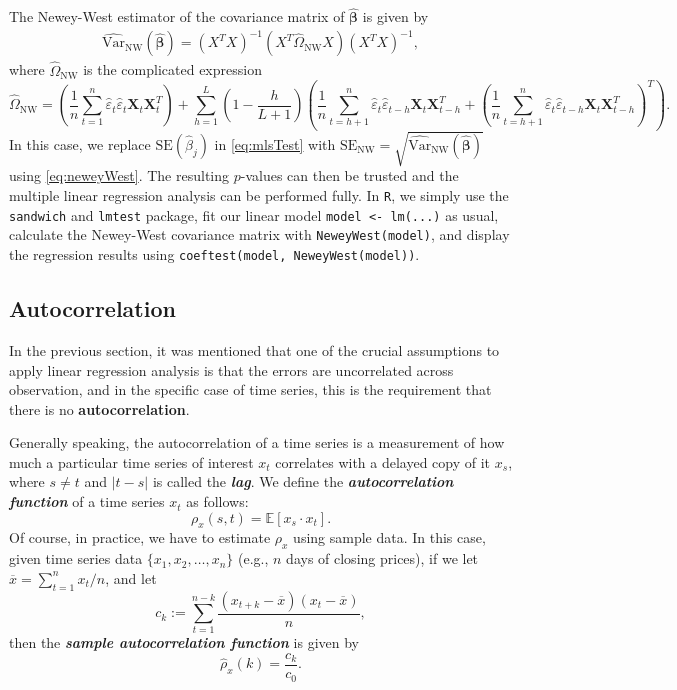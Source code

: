 \documentclass[12pt]{article}
\begin{document}
	
	The Newey-West estimator of the covariance matrix of $\widehat{\boldsymbol \beta}$ is given by
		\begin{eqnarray}
			\label{eq:neweyWest}
			\widehat{\mathrm{Var}}_{\mathrm{NW}}(\widehat{\boldsymbol \beta}) = (X^T X)^{-1} \left(X^T \widehat{\Omega}_{\mathrm{NW}}X\right)(X^T X)^{-1},
		\end{eqnarray}
		where $\widehat{\Omega}_{\mathrm{NW}}$ is the complicated expression $$\widehat{\Omega}_{\mathrm{NW}} = \left(\frac{1}{n}\sum_{t = 1}^n \widehat{\varepsilon}_t \widehat{\varepsilon}_{t} \mathbf{X}_t \mathbf{X}_{t}^T\right) + \sum_{h = 1}^L \left(1 - \frac{h}{L+ 1}\right)\left(\frac{1}{n}\sum_{t = h + 1}^n \widehat{\varepsilon}_t \widehat{\varepsilon}_{t - h} \mathbf{X}_t \mathbf{X}_{t - h}^T + \left(\frac{1}{n}\sum_{t = h + 1}^n \widehat{\varepsilon}_t \widehat{\varepsilon}_{t - h} \mathbf{X}_t \mathbf{X}_{t - h}^T\right)^T\right).$$
		In this case, we replace $\mathrm{SE}(\widehat{\beta}_j)$ in \autoref{eq:mlsTest} with $\mathrm{SE}_{\mathrm{NW}} = \sqrt{	\widehat{\mathrm{Var}}_{\mathrm{NW}}(\widehat{\boldsymbol \beta})}$ using \autoref{eq:neweyWest}. The resulting $p$-values can then be trusted and the multiple linear regression analysis can be performed fully. In \texttt{R}, we simply use the \texttt{sandwich} and \texttt{lmtest} package, fit our linear model \texttt{model <- lm(...)} as usual, calculate the Newey-West covariance matrix with \texttt{NeweyWest(model)}, and display the regression results using \texttt{coeftest(model, NeweyWest(model))}. 
		\newpage 
		\subsection{Autocorrelation}
		\label{subsec:2.4}
		In the previous section, it was mentioned that one of the crucial assumptions to apply linear regression analysis is that the errors are uncorrelated across observation, and in the specific case of time series, this is the requirement that there is no \textbf{autocorrelation}. 
		
		
		Generally speaking, the autocorrelation of a time series is a measurement of how much a particular time series of interest $x_t$ correlates with a delayed copy of it $x_{s}$, where $s \neq t$ and $|t - s|$ is called the \textbf{\textit{lag}}. We define the \textbf{\textit{autocorrelation function}} of a time series $x_t$ as follows: 
		\begin{equation}
			\label{eq:acfFunction}
			\rho_{x}(s, t) = \mathbb{E}[x_s \cdot x_t].
			\end{equation} 
		Of course, in practice, we have to estimate $\rho_x$ using sample data. In this case, given time series data $\{x_1, x_2, \dots, x_n\}$ (e.g., $n$ days of closing prices), if we let $\overline{x} = \sum_{t = 1}^n x_t /n$, and let $$c_k := \sum_{t = 1}^{n - k} \frac{(x_{t + k} - \overline{x})(x_t - \overline{x})}{n},$$ then the \textbf{\textit{sample autocorrelation function}} is given by 
		\begin{equation}
			\label{eq:acfSample}
			\hat{\rho}_x(k) = \frac{c_k}{c_0}.
		\end{equation}
		
\end{document}
